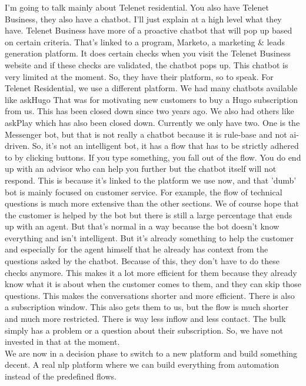 \begin{appendices}
	I'm going to talk mainly about Telenet residential. You also have Telenet Business, they also have a chatbot. I'll just explain at a high level what they have. Telenet Business have more of a proactive chatbot that will pop up based on certain criteria. That's linked to a program, Marketo, a marketing & leads generation platform. It does certain checks when you visit the Telenet Business website and if these checks are validated, the chatbot pops up. This chatbot is very limited at the moment. So, they have their platform, so to speak. For Telenet Residential, we use a different platform. We had many chatbots available like askHugo That was for motivating new customers to buy a Hugo subscription from us. This has been closed down since two years ago. We also had others like askPlay which has also been closed down. Currently we only have two. One is the Messenger bot, but that is not really a chatbot because it is rule-base and not \acrshort{ai}-driven. So, it's not an intelligent bot, it has a flow that has to be strictly adhered to by clicking buttons. If you type something, you fall out of the flow. You do end up with an advisor who can help you further but the chatbot itself will not respond. This is because it's linked to the platform we use now, and that 'dumb' bot is mainly focused on customer service. For example, the flow of technical questions is much more extensive than the other sections. We of course hope that the customer is helped by the bot but there is still a large percentage that ends up with an agent. But that's normal in a way because the bot doesn't know everything and isn't intelligent. But it's already something to help the customer and especially for the agent himself that he already has context from the questions asked by the chatbot. Because of this, they don't have to do these checks anymore. This makes it a lot more efficient for them because they already know what it is about when the customer comes to them, and they can skip those questions. This makes the conversations shorter and more efficient.
	There is also a subscription window. This also gets them to us, but the flow is much shorter and much more restricted. There is way less inflow and less contact. The bulk simply has a problem or a question about their subscription. So, we have not invested in that at the moment.\\
	\break
	We are now in a decision phase to switch to a new platform and build something decent. A real \acrshort{nlp} platform where we can build everything from automation instead of the predefined flows.
	

\end{appendices}
